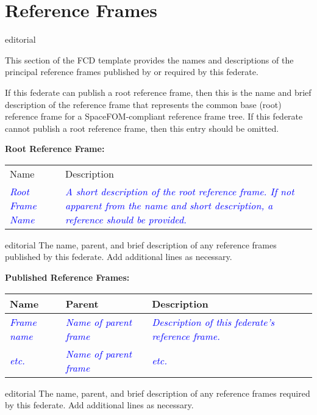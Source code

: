 \documentclass[11pt,english,letterpaper]{article}
\newcommand{\example}[1]{{\textcolor{blue}{\textit{#1}}}}
\begin{document}
\section*{Reference Frames}

\begin{shownto}{editorial}
{\color{red} This section of the FCD template provides the names and
descriptions of the principal reference frames published by or required by
this federate.

If this federate can publish a root reference frame, then this is the name and
brief description of the reference frame that represents the common base (root)
reference frame for a SpaceFOM-compliant reference frame tree. If this federate
cannot publish a root reference frame, then this entry should be omitted.}
\end{shownto}

\textbf{Root Reference Frame: }

\begin{tabularx}{\textwidth}{lX}
Name & Description \\
\example{Root Frame Name} &
\example{A short description of the root reference frame.  If not apparent from
the name and short description, a reference should be provided.\cite{vallado2001}}
\end{tabularx}

\begin{shownto}{editorial}
{\color{red} The name, parent, and brief description of any reference frames
published by this federate. Add additional lines as necessary.}
\end{shownto}

\textbf{Published Reference Frames: }

\begin{tabularx}{\textwidth}{|l|l|X|} \hline
Name & Parent & Description \\ \hline
\example{Frame name} &
\example{Name of parent frame} &
\example{Description of this federate's reference frame.} \\ \hline
\example{etc.} &
\example{Name of parent frame} &
\example{etc.} \\ \hline
\end{tabularx}

\begin{shownto}{editorial}
{\color{red} The name, parent, and brief description of any reference frames
required by this federate. Add additional lines as necessary.}
\end{shownto}
\end{document}
